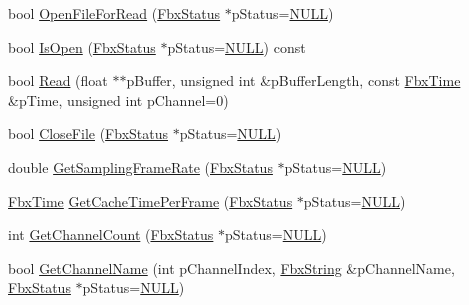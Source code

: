 \begin{DoxyCompactItemize}
\item 
bool \hyperlink{class_fbx_cache_afb4370a1e87dbf36b92f0fa61ea64db8}{Open\+File\+For\+Read} (\hyperlink{class_fbx_status}{Fbx\+Status} $\ast$p\+Status=\hyperlink{fbxarch_8h_a070d2ce7b6bb7e5c05602aa8c308d0c4}{N\+U\+LL})
\item 
bool \hyperlink{class_fbx_cache_af2ca87b431feef6ad4e106271f774672}{Is\+Open} (\hyperlink{class_fbx_status}{Fbx\+Status} $\ast$p\+Status=\hyperlink{fbxarch_8h_a070d2ce7b6bb7e5c05602aa8c308d0c4}{N\+U\+LL}) const
\item 
bool \hyperlink{class_fbx_cache_a077130baffaab6448fbc984fec82f338}{Read} (float $\ast$$\ast$p\+Buffer, unsigned int \&p\+Buffer\+Length, const \hyperlink{class_fbx_time}{Fbx\+Time} \&p\+Time, unsigned int p\+Channel=0)
\item 
bool \hyperlink{class_fbx_cache_a5964ea31f7b94da6ece571748da74d95}{Close\+File} (\hyperlink{class_fbx_status}{Fbx\+Status} $\ast$p\+Status=\hyperlink{fbxarch_8h_a070d2ce7b6bb7e5c05602aa8c308d0c4}{N\+U\+LL})
\item 
double \hyperlink{class_fbx_cache_a2b18922a125946be8ff89940f21ee3f2}{Get\+Sampling\+Frame\+Rate} (\hyperlink{class_fbx_status}{Fbx\+Status} $\ast$p\+Status=\hyperlink{fbxarch_8h_a070d2ce7b6bb7e5c05602aa8c308d0c4}{N\+U\+LL})
\item 
\hyperlink{class_fbx_time}{Fbx\+Time} \hyperlink{class_fbx_cache_ab4407b29da65a695454e04731ba04200}{Get\+Cache\+Time\+Per\+Frame} (\hyperlink{class_fbx_status}{Fbx\+Status} $\ast$p\+Status=\hyperlink{fbxarch_8h_a070d2ce7b6bb7e5c05602aa8c308d0c4}{N\+U\+LL})
\item 
int \hyperlink{class_fbx_cache_a1e2a07637eec39ae1eefb85fa29bc552}{Get\+Channel\+Count} (\hyperlink{class_fbx_status}{Fbx\+Status} $\ast$p\+Status=\hyperlink{fbxarch_8h_a070d2ce7b6bb7e5c05602aa8c308d0c4}{N\+U\+LL})
\item 
bool \hyperlink{class_fbx_cache_a9a9f0069551a1445ea4856580123ea9a}{Get\+Channel\+Name} (int p\+Channel\+Index, \hyperlink{class_fbx_string}{Fbx\+String} \&p\+Channel\+Name, \hyperlink{class_fbx_status}{Fbx\+Status} $\ast$p\+Status=\hyperlink{fbxarch_8h_a070d2ce7b6bb7e5c05602aa8c308d0c4}{N\+U\+LL})
\end{DoxyCompactItemize}
